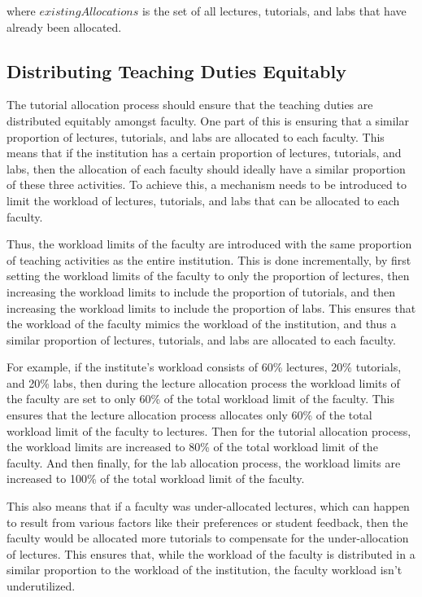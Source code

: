 where $existingAllocations$ is the set of all lectures, tutorials, and labs that have already been allocated.

\subsection{Distributing Teaching Duties Equitably}
\label{sec:workload_limits}

The tutorial allocation process should ensure that the teaching duties are distributed equitably amongst faculty. One part of this is ensuring that a similar proportion of lectures, tutorials, and labs are allocated to each faculty. This means that if the institution has a certain proportion of lectures, tutorials, and labs, then the allocation of each faculty should ideally have a similar proportion of these three activities. To achieve this, a mechanism needs to be introduced to limit the workload of lectures, tutorials, and labs that can be allocated to each faculty.

Thus, the workload limits of the faculty are introduced with the same proportion of teaching activities as the entire institution. This is done incrementally, by first setting the workload limits of the faculty to only the proportion of lectures, then increasing the workload limits to include the proportion of tutorials, and then increasing the workload limits to include the proportion of labs. This ensures that the workload of the faculty mimics the workload of the institution, and thus a similar proportion of lectures, tutorials, and labs are allocated to each faculty.

For example, if the institute's workload consists of 60\% lectures, 20\% tutorials, and 20\% labs, then during the lecture allocation process the workload limits of the faculty are set to only 60\% of the total workload limit of the faculty. This ensures that the lecture allocation process allocates only 60\% of the total workload limit of the faculty to lectures. Then for the tutorial allocation process, the workload limits are increased to 80\% of the total workload limit of the faculty. And then finally, for the lab allocation process, the workload limits are increased to 100\% of the total workload limit of the faculty.

This also means that if a faculty was under-allocated lectures, which can happen to result from various factors like their preferences or student feedback, then the faculty would be allocated more tutorials to compensate for the under-allocation of lectures. This ensures that, while the workload of the faculty is distributed in a similar proportion to the workload of the institution, the faculty workload isn't underutilized.

